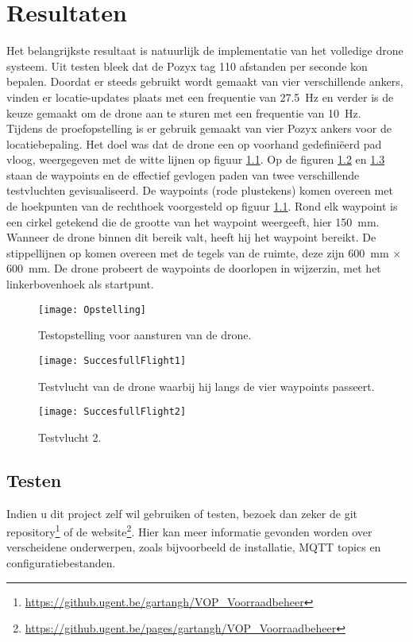 \chapter{Resultaten}
Het belangrijkste resultaat is natuurlijk de implementatie van het volledige drone systeem. Uit testen bleek dat de Pozyx tag 110 afstanden per seconde kon bepalen. Doordat er steeds gebruikt wordt gemaakt van vier verschillende ankers, vinden er locatie-updates plaats met een frequentie van \SI{27.5}{\Hz} en verder is de keuze gemaakt om de drone aan te sturen met een frequentie van \SI{10}{\Hz}.\\

Tijdens de proefopstelling is er gebruik gemaakt van vier Pozyx ankers voor de locatiebepaling. Het doel was dat de drone een op voorhand gedefini\"eerd pad vloog, weergegeven met de witte lijnen op figuur \ref{fig:Opstelling}. Op de figuren \ref{fig:SuccesfullFlight1} en \ref{fig:SuccesfullFlight2} staan de waypoints en de effectief gevlogen paden van twee verschillende testvluchten gevisualiseerd.
De waypoints (rode plustekens) komen overeen met de hoekpunten van de rechthoek voorgesteld op figuur \ref{fig:Opstelling}.
Rond elk waypoint is een cirkel getekend die de grootte van het waypoint weergeeft, hier \SI{150}{\mm}.
Wanneer de drone binnen dit bereik valt, heeft hij het waypoint bereikt.
De stippellijnen op komen overeen met de tegels van de ruimte, deze zijn \SI{600}{\mm} $\times$ \SI{600}{\mm}.
De drone probeert de waypoints de doorlopen in wijzerzin, met het linkerbovenhoek als startpunt. 
\begin{figure}[p]
	\centering
	\texttt{[image: Opstelling]}
	\caption[Opstelling testvluchten]{Testopstelling voor aansturen van de drone.}
	\label{fig:Opstelling}
\end{figure}

\begin{figure}[p]	
	\centering
	\texttt{[image: SuccesfullFlight1]}
	\caption[Testvlucht 1]{Testvlucht van de drone waarbij hij langs de vier waypoints passeert.}
	\label{fig:SuccesfullFlight1}
\end{figure}
	
\begin{figure}[p]
	\centering
	\texttt{[image: SuccesfullFlight2]}
	\caption[Testvlucht 2]{Testvlucht 2.}
	\label{fig:SuccesfullFlight2}
\end{figure}

\section{Testen} \label{sec:test}
Indien u dit project zelf wil gebruiken of testen, bezoek dan zeker de git repository\footnote{\url{https://github.ugent.be/gartangh/VOP_Voorraadbeheer}} of de website\footnote{\url{https://github.ugent.be/pages/gartangh/VOP_Voorraadbeheer}}.
Hier kan meer informatie gevonden worden over verscheidene onderwerpen, zoals bijvoorbeeld de installatie, MQTT topics en configuratiebestanden.

